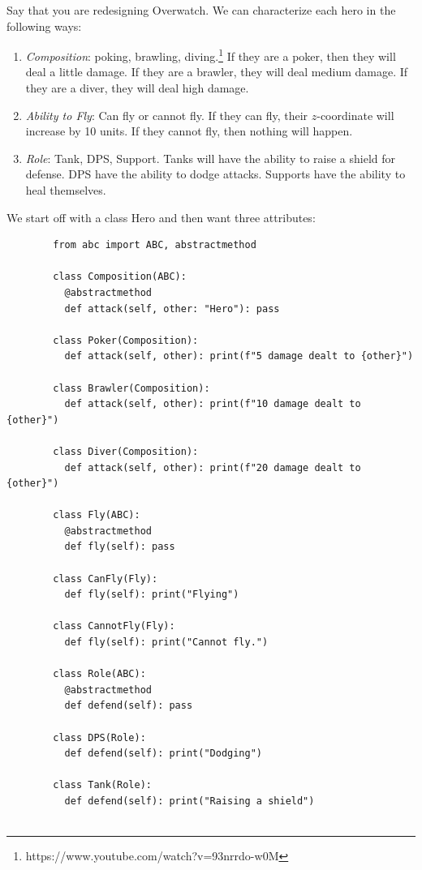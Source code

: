     \begin{example}[Overwatch]
      \label{ex:overwatch}
      Say that you are redesigning Overwatch. We can characterize each hero in the following ways: 
      \begin{enumerate}
        \item \textit{Composition}: poking, brawling, diving.\footnote{https://www.youtube.com/watch?v=93nrrdo-w0M} If they are a poker, then they will deal a little damage. If they are a brawler, they will deal medium damage. If they are a diver, they will deal high damage. 
        \item \textit{Ability to Fly}: Can fly or cannot fly. If they can fly, their $z$-coordinate will increase by 10 units. If they cannot fly, then nothing will happen. 
        \item \textit{Role}: Tank, DPS, Support. Tanks will have the ability to raise a shield for defense. DPS have the ability to dodge attacks. Supports have the ability to heal themselves. 
      \end{enumerate}
      We start off with a class Hero and then want three attributes: 

      \begin{lstlisting}
        from abc import ABC, abstractmethod

        class Composition(ABC): 
          @abstractmethod
          def attack(self, other: "Hero"): pass 

        class Poker(Composition): 
          def attack(self, other): print(f"5 damage dealt to {other}")

        class Brawler(Composition): 
          def attack(self, other): print(f"10 damage dealt to {other}")

        class Diver(Composition): 
          def attack(self, other): print(f"20 damage dealt to {other}")

        class Fly(ABC): 
          @abstractmethod 
          def fly(self): pass 

        class CanFly(Fly): 
          def fly(self): print("Flying") 

        class CannotFly(Fly): 
          def fly(self): print("Cannot fly.") 

        class Role(ABC): 
          @abstractmethod 
          def defend(self): pass 

        class DPS(Role): 
          def defend(self): print("Dodging") 

        class Tank(Role): 
          def defend(self): print("Raising a shield")


\end{lstlisting}
\end{example}
